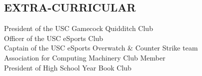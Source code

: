 \documentclass[line,margin]{res}
\begin{document}
\begin{resume}
\section{EXTRA-CURRICULAR}
				President of the USC Gamecock Quidditch Club \\
				Officer of the USC eSports Club \\
				Captain of the USC eSports Overwatch \& Counter Strike team \\
				Association for Computing Machinery Club Member \\
				President of High School Year Book Club
\end{resume}
\end{document}
